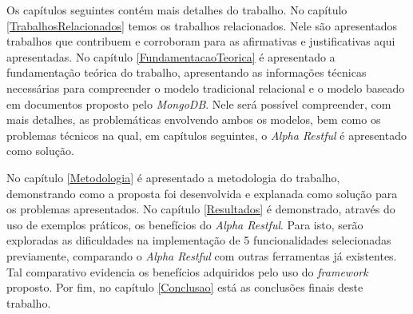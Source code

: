 
Os capítulos seguintes contém mais detalhes do trabalho. No capítulo \ref{TrabalhosRelacionados} temos os trabalhos relacionados. Nele são apresentados trabalhos que contribuem e corroboram para as afirmativas e justificativas aqui apresentadas. No capítulo \ref{FundamentacaoTeorica} é apresentado a fundamentação teórica do trabalho, apresentando as informações técnicas necessárias para compreender o modelo tradicional relacional e o modelo baseado em documentos proposto pelo \textit{MongoDB}. Nele será possível compreender, com mais detalhes, as problemáticas envolvendo ambos os modelos, bem como os problemas técnicos na qual, em capítulos seguintes, o \textit{Alpha Restful} é apresentado como solução.

No capítulo \ref{Metodologia} é apresentado a metodologia do trabalho, demonstrando como a proposta foi desenvolvida e explanada como solução para os problemas apresentados. No capítulo \ref{Resultados} é demonstrado, através do uso de exemplos práticos, os benefícios do \textit{Alpha Restful}. Para isto, serão exploradas as dificuldades na implementação de 5 funcionalidades selecionadas previamente, comparando o \textit{Alpha Restful} com outras ferramentas já existentes. Tal comparativo evidencia os benefícios adquiridos pelo uso do \textit{framework} proposto. Por fim, no capítulo \ref{Conclusao} está as conclusões finais deste trabalho.




